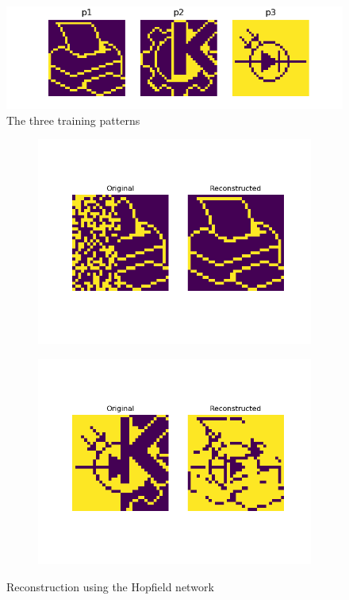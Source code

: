 \documentclass[a4paper]{article}
\begin{document}
\begin{figure}[ht]
   \centering
   \includegraphics[width=\linewidth]{figures/training.png}
   \caption{The three training patterns}
   \label{fig:training}
\end{figure}
\begin{figure}[ht]
   \begin{subfigure}[b]{0.5\textwidth}
   \centering
   \includegraphics[width=\linewidth]{figures/p10b.png}
   \end{subfigure}
  \begin{subfigure}[b]{0.5\textwidth}
   \centering
   \includegraphics[width=\linewidth]{figures/p11b.png}
   \end{subfigure}
   \caption{Reconstruction using the Hopfield network}
   \label{fig:reconstruction}
\end{figure}
\end{document}
